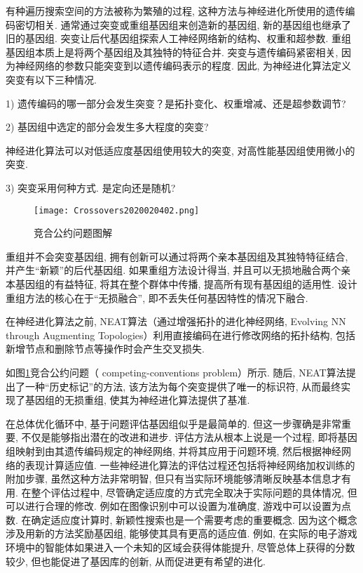 \begin{remark}
有种遍历搜索空间的方法被称为繁殖的过程, 这种方法与神经进化所使用的遗传编码密切相关. 通常通过突变或重组基因组来创造新的基因组, 新的基因组也继承了旧的基因组. 突变让后代基因组探索人工神经网络新的结构、权重和超参数. 重组基因组本质上是将两个基因组及其独特的特征合并.
突变与遗传编码紧密相关, 因为神经网络的参数只能突变到以遗传编码表示的程度. 因此, 为神经进化算法定义突变有以下三种情况.

1) 遗传编码的哪一部分会发生突变？是拓扑变化、权重增减、还是超参数调节?

2) 基因组中选定的部分会发生多大程度的突变?
\begin{example}
  神经进化算法可以对低适应度基因组使用较大的突变, 对高性能基因组使用微小的突变.
\end{example}

3) 突变采用何种方式. 是定向还是随机?
\begin{figure}[H]
\centering
\texttt{[image: Crossovers2020020402.png]}
\caption{竞合公约问题图解}
\label{Crossovers2020020402}
\end{figure}

重组并不会突变基因组, 拥有创新可以通过将两个亲本基因组及其独特特征结合, 并产生“新颖”的后代基因组. 如果重组方法设计得当, 并且可以无损地融合两个亲本基因组的有益特征, 将其在整个群体中传播, 提高所有现有基因组的适用性.
设计重组方法的核心在于“无损融合”, 即不丢失任何基因特性的情况下融合.
\begin{example}
  在神经进化算法之前, NEAT算法（通过增强拓扑的进化神经网络, Evolving NN through Augmenting Topologies）利用直接编码在进行修改网络的拓扑结构, 包括新增节点和删除节点等操作时会产生交叉损失.
\end{example}

如图\ref{Crossovers2020020402}竞合公约问题（ competing-conventions problem）所示. 随后, NEAT算法提出了一种“历史标记”的方法, 该方法为每个突变提供了唯一的标识符, 从而最终实现了基因组的无损重组, 使其为神经进化算法提供了基准.
\end{remark}

在总体优化循环中, 基于问题评估基因组似乎是最简单的. 但这一步骤确是非常重要, 不仅是能够指出潜在的改进和进步. 评估方法从根本上说是一个过程, 即将基因组映射到由其遗传编码规定的神经网络, 并将其应用于问题环境, 然后根据神经网络的表现计算适应值. 一些神经进化算法的评估过程还包括将神经网络加权训练的附加步骤, 虽然这种方法非常明智, 但只有当实际环境能够清晰反映基本信息才有用. 在整个评估过程中, 尽管确定适应度的方式完全取决于实际问题的具体情况, 但可以进行合理的修改. 例如在图像识别中可以设置为准确度, 游戏中可以设置为点数. 在确定适应度计算时, 新颖性搜索也是一个需要考虑的重要概念. 因为这个概念涉及用新的方法奖励基因组, 能够使其具有更高的适应值. 例如, 在实际的电子游戏环境中的智能体如果进入一个未知的区域会获得体能提升, 尽管总体上获得的分数较少, 但也能促进了基因库的创新, 从而促进更有希望的进化.

